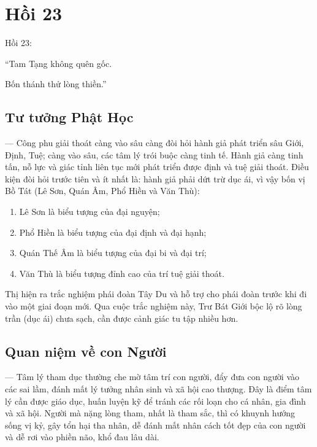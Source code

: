 \chapter{Hồi 23} %
\label{cha:hoi_23}

Hồi 23:

\begin{itshape}
``Tam Tạng không quên gốc.

Bốn thánh thử lòng thiền.''
\end{itshape}

\section{Tư tưởng Phật Học} %
\label{sec:23_phat_hoc}

— Công phu giải thoát càng vào sâu càng đòi hỏi hành giả phát triển sâu Giới, Định, Tuệ; càng vào sâu, các tâm lý trói buộc càng tinh tế. Hành giả càng tinh tấn, nỗ lực và giác tỉnh liên tục mới phát triển được định và tuệ giải thoát. Điều kiện đòi hỏi trước tiên và ít nhất là: hành giả phải dứt trừ dục ái, vì vậy bốn vị Bồ Tát (Lê Sơn, Quán Âm, Phổ Hiền và Văn Thù):

\begin{enumerate}[label=\itshape\arabic*\upshape/]
   \item Lê Sơn là biểu tượng của đại nguyện;

   \item Phổ Hiền là biểu tượng của đại định và đại hạnh;

   \item Quán Thế Âm là biểu tượng của đại bi và đại trí;

   \item Văn Thù là biểu tượng đỉnh cao của trí tuệ giải thoát.
\end{enumerate}

Thị hiện ra trắc nghiệm phái đoàn Tây Du và hỗ trợ cho phái đoàn trước khi đi vào một giai đoạn mới. Qua cuộc trắc nghiệm này, Trư Bát Giới bộc lộ rõ lòng trần (dục ái) chưa sạch, cần được cảnh giác tu tập nhiều hơn.

\section{Quan niệm về con Người} %
\label{sec:23_con_nguoi}

— Tâm lý tham dục thường che mờ tâm trí con người, đẩy đưa con người vào các sai lầm, đánh mất lý tưởng nhân sinh và xã hội cao thượng. Đây là điểm tâm lý cần được giáo dục, huấn luyện kỹ để tránh các rối loạn cho cá nhân, gia đình và xã hội. Người mà nặng lòng tham, nhất là tham sắc, thì có khuynh hướng sống vị kỷ, gây tổn hại tha nhân, dễ đánh mất nhân cách tốt đẹp của con người và dễ rơi vào phiền não, khổ đau lâu dài.

